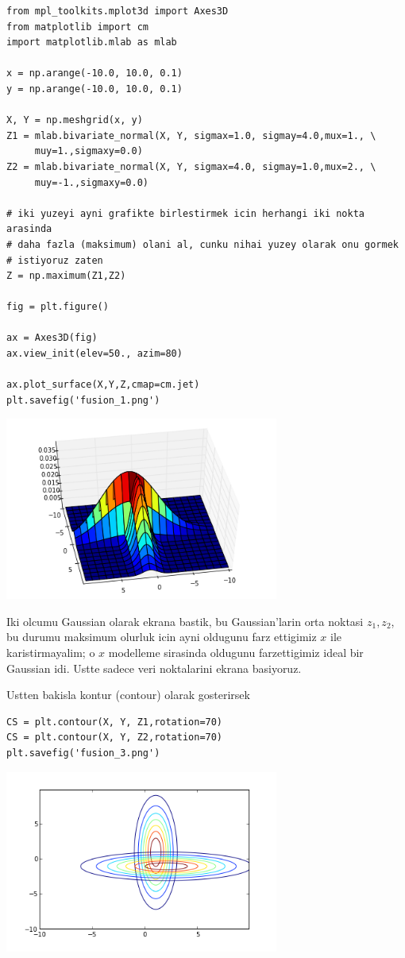 \documentclass[12pt,fleqn]{article}\usepackage{../common}
\begin{document}
\begin{verbatim}
from mpl_toolkits.mplot3d import Axes3D
from matplotlib import cm
import matplotlib.mlab as mlab

x = np.arange(-10.0, 10.0, 0.1)
y = np.arange(-10.0, 10.0, 0.1)

X, Y = np.meshgrid(x, y)
Z1 = mlab.bivariate_normal(X, Y, sigmax=1.0, sigmay=4.0,mux=1., \
     muy=1.,sigmaxy=0.0)
Z2 = mlab.bivariate_normal(X, Y, sigmax=4.0, sigmay=1.0,mux=2., \
     muy=-1.,sigmaxy=0.0)

# iki yuzeyi ayni grafikte birlestirmek icin herhangi iki nokta arasinda
# daha fazla (maksimum) olani al, cunku nihai yuzey olarak onu gormek 
# istiyoruz zaten
Z = np.maximum(Z1,Z2)

fig = plt.figure()

ax = Axes3D(fig)
ax.view_init(elev=50., azim=80)

ax.plot_surface(X,Y,Z,cmap=cm.jet)
plt.savefig('fusion_1.png')
\end{verbatim}


\includegraphics[height=6cm]{fusion_1.png}

Iki olcumu Gaussian olarak ekrana bastik, bu Gaussian'larin orta noktasi
$z_1,z_2$, bu durumu maksimum olurluk icin ayni oldugunu farz ettigimiz $x$
ile karistirmayalim; o $x$ modelleme sirasinda oldugunu farzettigimiz ideal
bir Gaussian idi. Ustte sadece veri noktalarini ekrana basiyoruz. 


Ustten bakisla kontur (contour) olarak gosterirsek 

\begin{verbatim}
CS = plt.contour(X, Y, Z1,rotation=70)
CS = plt.contour(X, Y, Z2,rotation=70)
plt.savefig('fusion_3.png')
\end{verbatim}

\includegraphics[height=6cm]{fusion_3.png}
\end{document}
